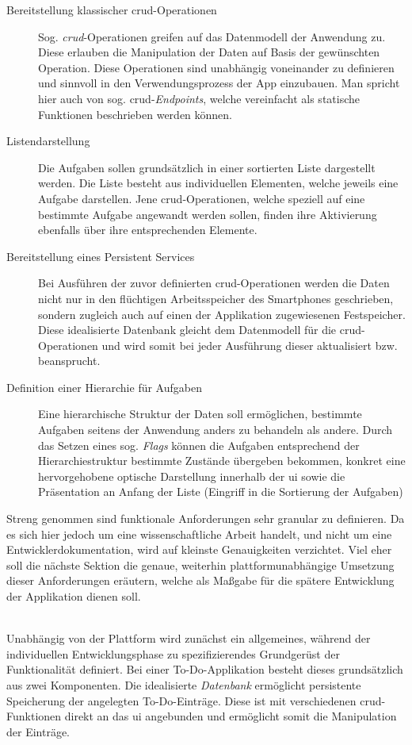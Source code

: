 \begin{description}
    \item[Bereitstellung klassischer \acs{crud}-Operationen] Sog. \textit{\ac{crud}}-Operationen greifen auf das Datenmodell der Anwendung zu. Diese erlauben die Manipulation der Daten auf Basis der gewünschten Operation. Diese Operationen sind unabhängig voneinander zu definieren und sinnvoll in den Verwendungsprozess der App einzubauen. Man spricht hier auch von sog. \ac{crud}-\textit{Endpoints}, welche vereinfacht als statische Funktionen beschrieben werden können.
    \item[Listendarstellung] Die Aufgaben sollen grundsätzlich in einer sortierten Liste dargestellt werden. Die Liste besteht aus individuellen Elementen, welche jeweils eine Aufgabe darstellen. Jene \ac{crud}-Operationen, welche speziell auf eine bestimmte Aufgabe angewandt werden sollen, finden ihre Aktivierung ebenfalls über ihre entsprechenden Elemente.
    \item[Bereitstellung eines Persistent Services] Bei Ausführen der zuvor definierten \ac{crud}-Operationen werden die Daten nicht nur in den flüchtigen Arbeitsspeicher des Smartphones geschrieben, sondern zugleich auch auf einen der Applikation zugewiesenen Festspeicher. Diese idealisierte Datenbank gleicht dem Datenmodell für die \ac{crud}-Operationen und wird somit bei jeder Ausführung dieser aktualisiert bzw. beansprucht.
    \item[Definition einer Hierarchie für Aufgaben] Eine hierarchische Struktur der Daten soll ermöglichen, bestimmte Aufgaben seitens der Anwendung anders zu behandeln als andere. Durch das Setzen eines sog. \textit{Flags} können die Aufgaben entsprechend der Hierarchiestruktur bestimmte Zustände übergeben bekommen, konkret eine hervorgehobene optische Darstellung innerhalb der \ac{ui} sowie die Präsentation an Anfang der Liste (Eingriff in die Sortierung der Aufgaben)
\end{description}


Streng genommen sind funktionale Anforderungen sehr granular zu definieren. Da es sich hier jedoch um eine wissenschaftliche Arbeit handelt, und nicht um eine Entwicklerdokumentation, wird auf kleinste Genauigkeiten verzichtet. Viel eher soll die nächste Sektion die genaue, weiterhin plattformunabhängige Umsetzung dieser Anforderungen eräutern, welche als Maßgabe für die spätere Entwicklung der Applikation dienen soll. \\\

Unabhängig von der Plattform wird zunächst ein allgemeines, während der individuellen Entwicklungsphase zu spezifizierendes Grundgerüst der Funktionalität definiert. Bei einer To-Do-Applikation besteht dieses grundsätzlich aus zwei Komponenten. Die idealisierte \textit{Datenbank} ermöglicht persistente Speicherung der angelegten To-Do-Einträge. Diese ist mit verschiedenen \ac{crud}-Funktionen direkt an das \ac{ui} angebunden und ermöglicht somit die Manipulation der Einträge.

